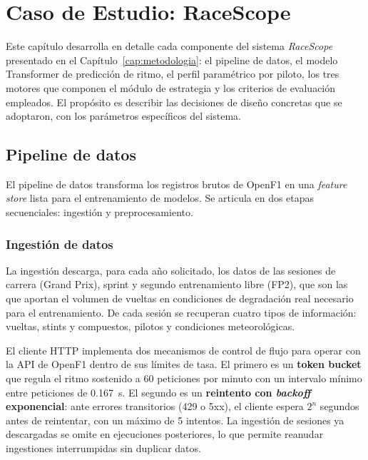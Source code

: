 
\chapter{Caso de Estudio: RaceScope}
\label{cap:caso_estudio}

Este capítulo desarrolla en detalle cada componente del sistema \textit{RaceScope} presentado en el Capítulo~\ref{cap:metodologia}: el pipeline de datos, el modelo Transformer de predicción de ritmo, el perfil paramétrico por piloto, los tres motores que componen el módulo de estrategia y los criterios de evaluación empleados. El propósito es describir las decisiones de diseño concretas que se adoptaron, con los parámetros específicos del sistema.

\section{Pipeline de datos}
\label{sec:pipeline_datos}

El pipeline de datos transforma los registros brutos de OpenF1 en una \textit{feature store} lista para el entrenamiento de modelos. Se articula en dos etapas secuenciales: ingestión y preprocesamiento.

\subsection{Ingestión de datos}
\label{ssec:ingestion}

La ingestión descarga, para cada año solicitado, los datos de las sesiones de carrera (Grand Prix), sprint y segundo entrenamiento libre (FP2), que son las que aportan el volumen de vueltas en condiciones de degradación real necesario para el entrenamiento. De cada sesión se recuperan cuatro tipos de información: vueltas, stints y compuestos, pilotos y condiciones meteorológicas.

El cliente HTTP implementa dos mecanismos de control de flujo para operar con la API de OpenF1 dentro de sus límites de tasa. El primero es un \textbf{token bucket} que regula el ritmo sostenido a 60 peticiones por minuto con un intervalo mínimo entre peticiones de 0.167~s. El segundo es un \textbf{reintento con \textit{backoff} exponencial}: ante errores transitorios (429 o 5xx), el cliente espera $2^n$ segundos antes de reintentar, con un máximo de 5 intentos. La ingestión de sesiones ya descargadas se omite en ejecuciones posteriores, lo que permite reanudar ingestiones interrumpidas sin duplicar datos.

